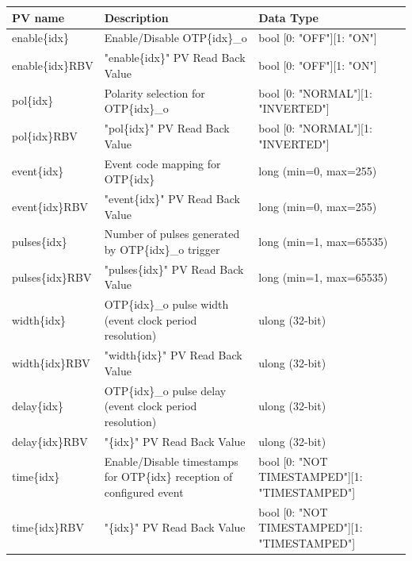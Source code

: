 \documentclass[openany]{article}
\begin{document}
			\begin{center}
			\begin{tabular}{| m{2.8cm} m{6cm} m{6cm} |}
			    \hline
			    \bfseries PV name & \bfseries Description & \bfseries Data Type \\ \hline
			    enable\{idx\} & Enable/Disable OTP\{idx\}\_o & bool [0: "OFF"][1: "ON"] \\ \hline
			    enable\{idx\}RBV & "enable\{idx\}" PV Read Back Value & bool [0: "OFF"][1: "ON"] \\ \hline
			    pol\{idx\} & Polarity selection for OTP\{idx\}\_o & bool [0: "NORMAL"][1: "INVERTED"] \\ \hline
			    pol\{idx\}RBV & "pol\{idx\}" PV Read Back Value & bool [0: "NORMAL"][1: "INVERTED"] \\ \hline
			    event\{idx\} & Event code mapping for OTP\{idx\} & long (min=0, max=255) \\ \hline
			    event\{idx\}RBV & "event\{idx\}" PV Read Back Value & long (min=0, max=255) \\ \hline
			    pulses\{idx\} & Number of pulses generated by OTP\{idx\}\_o trigger & long (min=1, max=65535) \\ \hline
			    pulses\{idx\}RBV & "pulses\{idx\}" PV Read Back Value & long (min=1, max=65535) \\ \hline
			    width\{idx\} & OTP\{idx\}\_o pulse width (event clock period resolution) & ulong (32-bit) \\ \hline
			    width\{idx\}RBV & "width\{idx\}" PV Read Back Value & ulong (32-bit) \\ \hline
			    delay\{idx\} & OTP\{idx\}\_o pulse delay (event clock period resolution) & ulong (32-bit) \\ \hline
			    delay\{idx\}RBV & "\{idx\}" PV Read Back Value & ulong (32-bit) \\ \hline
			    time\{idx\} & Enable/Disable timestamps for OTP\{idx\} reception of configured event & bool [0: "NOT TIMESTAMPED"][1: "TIMESTAMPED"] \\ \hline
			    time\{idx\}RBV & "\{idx\}" PV Read Back Value & bool [0: "NOT TIMESTAMPED"][1: "TIMESTAMPED"] \\ \hline
			\end{tabular}
			\end{center}
\end{document}
